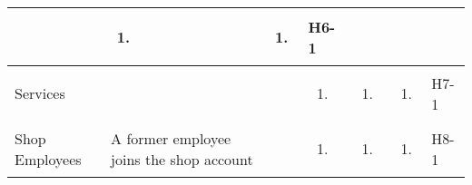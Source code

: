 \documentclass{article}
\begin{document}
\begin{landscape}
\begin{table}[H]
\begin{adjustbox}{width=\paperwidth}
\begin{tabular}{|p{}|p{}|p{}|p{}|p{}|p{}|p{}|}
				               & \begin{enumerate}[label=\alph*, leftmargin=*]
					                 \item
				                 \end{enumerate}
				               & \begin{enumerate}[label=\alph*, leftmargin=*]
					                 \item
				                 \end{enumerate}
				               & H6-1                                                                            \\
				\hline
				Services
				               & ~
				               & ~
				               & \begin{enumerate}[label=\alph*, leftmargin=*]
					                 \item
				                 \end{enumerate}
				               & \begin{enumerate}[label=\alph*, leftmargin=*]
					                 \item
				                 \end{enumerate}
				               & \begin{enumerate}[label=\alph*, leftmargin=*]
					                 \item
				                 \end{enumerate}
				               & H7-1                                                                            \\
				\hline
				Shop Employees & A former employee joins the shop account
				               & ~
				               & \begin{enumerate}[label=\alph*, leftmargin=*]
					                 \item
				                 \end{enumerate}
				               & \begin{enumerate}[label=\alph*, leftmargin=*]
					                 \item
				                 \end{enumerate}
				               & \begin{enumerate}[label=\alph*, leftmargin=*]
					                 \item
				                 \end{enumerate}
				               & H8-1                                                                            \\
				\hline
			\end{tabular}
		\end{adjustbox}
	\end{table}
\end{landscape}
\end{document}
